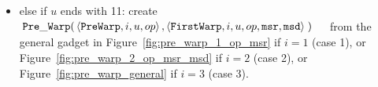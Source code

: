 \begin{itemize}
\begin{itemize}
            \item else if $u$ ends with 11:
            create
            $\begin{aligned}[t]
                {\tt Pre\_Warp}(& \left\langle {\tt PreWarp},   i, u, op \right\rangle,
                           \left\langle {\tt FirstWarp}, i, u, op, {\tt msr}, {\tt msd} \right\rangle \;)
            \end{aligned}$ from the general gadget in Figure~\ref{fig:pre_warp_1_op_msr} if $i = 1$ (case 1),
            or Figure~\ref{fig:pre_warp_2_op_msr_msd} if $i = 2$ (case 2), or Figure~\ref{fig:pre_warp_general} if $i = 3$ (case 3).
        \end{itemize}
        \vspace{.5cm}

        \begin{figure}[H]
            \centering
            {}%
            ~

\end{figure}
\end{itemize}
